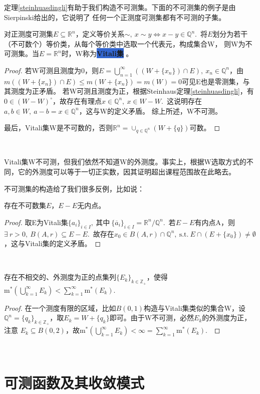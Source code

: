 \documentclass[color=green,thmcnt=section,lang=cn,12pt]{elegantbook}
\makeatletter
\numberwithin{equation}{section}%
\numberwithin{figure}{section}%
\newcommand{\RR}{\mathbb{R}}
\renewcommand{\RN}{\RR^n}
\newcommand{\QQ}{\mathbb{Q}}
\newcommand{\ZZ}{\mathbb{Z}}
\newcommand{\exi}{\exists \ }
\newcommand{\sothat}{\ \textrm{s.t.}\ }
\newcommand{\csf}[1]{\{#1_k\}_{k\in \ZZ_+}} %
\newcommand{\cu}[1]{\bigcup_{#1=1}^{\infty}} %
\newcommand{\cs}[1]{\sum_{#1=1}^{\infty}} %
\newcommand{\mx}[1]{\textrm{m}^*(#1)} %
\newcommand{\bi}[2]{\colorbox{highlight}{\textbf{\textcolor[RGB]{14,14,94}{#1}}}\index{#2@#1} \label{#2}} %
\makeatother
\begin{document}
定理\ref{steinhuasdingli}有助于我们构造不可测集。下面的不可测集的例子是由Sierpinski给出的，它说明了
任何一个正测度可测集都有不可测的子集。
\begin{proposition}[不可测集的构造]\label{bukeceji}
    对正测度可测集$E\subseteq \RN$，定义等价关系$\sim,\ x\sim y \Longleftrightarrow x-y\in \QQ^n$.\ 将$E$划分为若干（不可数个）等价类，从每个等价类中选取一个代表元，构成集合W，
    则W为不可测集。当$E=\RN$时，W称为\bi{Vitali集}{vitaliji}。
\end{proposition}
\begin{proof}
    若W可测且测度为0，则$E=\cu{n}((W+\{x_n\})\cap E),\ x_n\in\QQ^n$，由$m((W+\{x_n\})\cap E)\leq m(W+\{x_n\})=m(W)=0$可见E也是零测集，与其测度为正矛盾。
若W可测且测度为正，根据Steinhaus定理\ref{steinhuasdingli}，有$0\in (W-W)^\circ$，故存在有理点$x\in \QQ^n,\ x\in W-W$.\ 这说明存在$a,b\in W,\ a-b=x\in\QQ^n$，这与W的定义矛盾。
    综上所述，W不可测。


    最后，Vitali集W是不可数的，否则$\RN=\cup_{q\in \QQ^n}(W+\{q\})$可数。
\end{proof}
\ 


Vitali集W不可测，但我们依然不知道W的外测度。事实上，根据W选取方式的不同，它的外测度可以等于一切正实数，因其证明超出课程范围故在此略去。


不可测集的构造给了我们很多反例，比如说：\\
\begin{example}
    存在不可数集$E$，$E-E$无内点。
\end{example}
\begin{proof}
    取E为Vitali集$\{a_i\}_{i\in I},\ \mbox{其中}\ \{\overline{a}_i\}_{i \in I}= \RN/\QQ^n$.\ 若$E-E$有内点A，则$\exi r>0, \ B(A,r)\subseteq E-E$.\ 
    故存在$x_0\in B(A,r)\cap \QQ^n,\sothat E\cap (E+\{x_0\})\neq \emptyset$，这与Vitali集的定义矛盾。
\end{proof}
\ 


\begin{example}
    存在不相交的、外测度为正的点集列$\csf{E}$，使得$\mx{\cu{k}E_k}<\cs{k}\mx{E_k}$.\ 
\end{example}
\begin{proof}
    在一个测度有限的区域，比如$B(0,1)$构造与Vitali集类似的集合W，设$\QQ^n=\csf{q}$，取$E_k=W+\{q_k\}$即可。由于W不可测，必然$E_k$的外测度为正，注意
    $E_k\subseteq B(0,2)$，故$\mx{\cu{k}E_k}<\infty=\cs{k}\mx{E_k}$.\ 
\end{proof}
\ 


\newpage\section{可测函数及其收敛模式}
\end{document}
